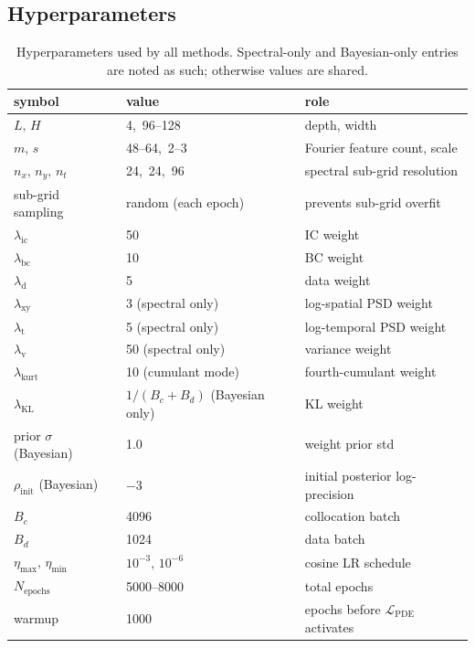 \documentclass[10pt]{elsarticle}
\begin{document}
\subsection{Hyperparameters}
\label{subsec:hyper}

\begin{table}[h]
\centering
\caption{Hyperparameters used by all methods. Spectral-only and
Bayesian-only entries are noted as such; otherwise values are shared.}
\label{tab:hyper}
\begin{tabular}{l l l}
\toprule
symbol & value & role \\
\midrule
\(L,\,H\)          & 4,\, 96--128 & depth, width \\
\(m,\,s\)          & 48--64,\, 2--3 & Fourier feature count, scale \\
\(n_x,\,n_y,\,n_t\)     & 24,\, 24,\, 96 & spectral sub-grid resolution \\
sub-grid sampling       & random (each epoch) & prevents sub-grid overfit \\
\(\lambda_{\mathrm{ic}}\)  & 50 & IC weight \\
\(\lambda_{\mathrm{bc}}\)  & 10 & BC weight \\
\(\lambda_{\mathrm d}\)   & 5 & data weight \\
\(\lambda_{\mathrm{xy}}\)  & 3 (spectral only) & log-spatial PSD weight \\
\(\lambda_{\mathrm{t}}\)   & 5 (spectral only) & log-temporal PSD weight \\
\(\lambda_{\mathrm{v}}\)   & 50 (spectral only) & variance weight \\
\(\lambda_{\mathrm{kurt}}\) & 10 (cumulant mode) & fourth-cumulant weight \\
\(\lambda_{\mathrm{KL}}\)  & \(1/(B_c+B_d)\) (Bayesian only) & KL weight \\
prior \(\sigma\) (Bayesian) & 1.0 & weight prior std \\
\(\rho_{\mathrm{init}}\) (Bayesian) & \(-3\) & initial posterior log-precision \\
\(B_c\)           & 4096 & collocation batch \\
\(B_d\)           & 1024 & data batch \\
\(\eta_{\max},\,\eta_{\min}\)& \(10^{-3},\,10^{-6}\) & cosine LR schedule \\
\(N_{\mathrm{epochs}}\)   & 5000--8000 & total epochs \\
warmup            & 1000 & epochs before \(\mathcal L_{\mathrm{PDE}}\) activates \\
\bottomrule
\end{tabular}
\end{table}
\end{document}
